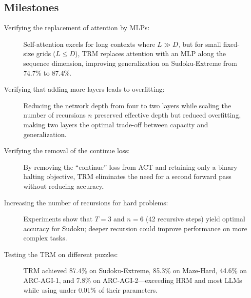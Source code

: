 \documentclass[dtu]{dtuarticle}
\begin{document}
	\subsection*{Milestones}

	\begin{description}
		\item[Verifying the replacement of attention by MLPs:] Self-attention excels for long contexts where $L \gg D$, but for small fixed-size grids ($L \leq D$), TRM replaces attention with an MLP along the sequence dimension, improving generalization on Sudoku-Extreme from 74.7\% to 87.4\%.
		\item[Verifying that adding more layers leads to overfitting:] Reducing the network depth from four to two layers while scaling the number of recursions $n$ preserved effective depth but reduced overfitting, making two layers the optimal trade-off between capacity and generalization.
		\item[Verifying the removal of the continue loss:] By removing the ``continue'' loss from ACT and retaining only a binary halting objective, TRM eliminates the need for a second forward pass without reducing accuracy.
		\item[Increasing the number of recursions for hard problems:] Experiments show that $T = 3$ and $n = 6$ (42 recursive steps) yield optimal accuracy for Sudoku; deeper recursion could improve performance on more complex tasks.
		\item[Testing the TRM on different puzzles:] TRM achieved 87.4\% on Sudoku-Extreme, 85.3\% on Maze-Hard, 44.6\% on ARC-AGI-1, and 7.8\% on ARC-AGI-2—exceeding HRM and most LLMs while using under 0.01\% of their parameters.
	\end{description}

	\nocite{paper}

	
	
\end{document}
